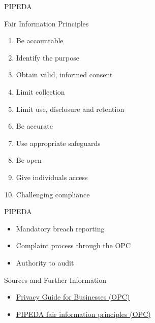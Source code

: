 \documentclass[ignorenonframetext,xcolor=x11names]{beamer}
\begin{document}
\begin{frame}{PIPEDA}
\begin{block}{Fair Information Principles}
\begin{enumerate}
   \item Be accountable
   \item Identify the purpose
   \item Obtain valid, informed consent
   \item Limit collection
   \item Limit use, disclosure and retention
   \item Be accurate
   \item Use appropriate safeguards
   \item Be open
   \item Give individuals access
   \item Challenging compliance
\end{enumerate}
\end{block}
\end{frame}

\begin{frame}{PIPEDA}
\begin{itemize}
   \item Mandatory breach reporting
   \item Complaint process through the OPC
   \item Authority to audit
\end{itemize}
\begin{block}{Sources and Further Information}
\begin{itemize}
   \item \href{https://www.priv.gc.ca/media/2038/guide_org_e.pdf}{Privacy Guide for Businesses (OPC)}
   \item \href{https://www.priv.gc.ca/en/privacy-topics/privacy-laws-in-canada/the-personal-information-protection-and-electronic-documents-act-pipeda/p_principle/}{PIPEDA fair information principles (OPC)}
\end{itemize}
\end{block}
\end{frame}
\end{document}
